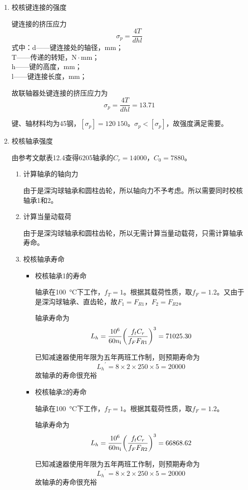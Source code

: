 \begin{enumerate}[A]
	\item 校核键连接的强度
	\par 键连接的挤压应力\\$$\sigma_p=\dfrac{4T}{dhl}$$
	式中：d——键连接处的轴径，mm；\\
	T——传递的转矩，$\mathrm{N}\cdot \mathrm{mm}$；\\
	h——键的高度，mm；\\
	l——键连接长度，mm；
	\par 故联轴器处键连接的挤压应力为$$\sigma_p=\dfrac{4T}{dhl}=13.71$$
	\par 键、轴材料均为45钢，$\left[\sigma_p\right]= 120~150$。$\sigma_p<\left[\sigma_p\right]$，故强度满足需要。
	\item 校核轴承强度
	\par 由参考文献\cite{1}表12.4查得6205轴承的$C_r=14000$，$C_0=7880$。
	\begin{enumerate}[a]
		\item 计算轴承的轴向力
		\par 由于是深沟球轴承和圆柱齿轮，所以轴向力不予考虑。所以需要同时校核轴承1和2。
		\item 计算当量动载荷
		\par 由于是深沟球轴承和圆柱齿轮，所以无需计算当量动载荷，只需计算轴承寿命。
		\item 校核轴承寿命
		\begin{itemize}
			\item 校核轴承1的寿命
			\par 轴承在\SI{100}{\degreeCelsius}下工作，$f_T=1$。根据其载荷性质，取$f_F=1.2$。又由于是深沟球轴承、直齿轮，故$F_1=F_{R1}$，$F_2=F_{R2}$。
			\par 轴承寿命为
			$$L_h=\dfrac{10^6}{60n_{\mathrm{\uppercase\expandafter{\romannumeral1}}}}{\left(\dfrac{f_tC_r}{f_FF_{R1}}\right)}^3=71025.30$$
			\par 已知减速器使用年限为五年两班工作制，则预期寿命为
			$${L_h}^{\prime}=8\times 2\times 250\times 5=20000$$
			故轴承的寿命很充裕
			\item 校核轴承2的寿命
			\par 轴承在\SI{100}{\degreeCelsius}下工作，$f_T=1$。根据其载荷性质，取$f_F=1.2$。
			\par 轴承寿命为
			$$L_h=\dfrac{10^6}{60n_{\mathrm{\uppercase\expandafter{\romannumeral1}}}}{\left(\dfrac{f_tC_r}{f_FF_{R2}}\right)}^3=66868.62$$
			\par 已知减速器使用年限为五年两班工作制，则预期寿命为
			$${L_h}^{\prime}=8\times 2\times 250\times 5=20000$$
			故轴承的寿命很充裕
		\end{itemize}
	\end{enumerate}
\end{enumerate}